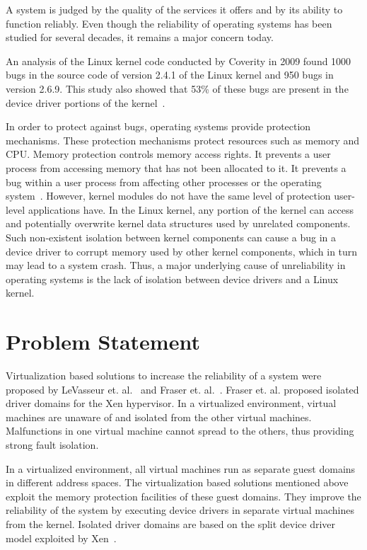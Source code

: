 A system is judged by the quality of the services it offers and by its
ability to function reliably. Even though the reliability of operating
systems has been studied for several decades, it remains a major concern
today.

An analysis of the Linux kernel code conducted by Coverity in 2009 found
1000 bugs in the source code of version 2.4.1 of the Linux kernel and
950 bugs in version 2.6.9. This study also showed that 53\% of these bugs are
present in the device driver portions of the kernel~\cite{coveritykernel}.

In order to protect against bugs, operating systems provide protection
mechanisms. These protection mechanisms protect resources such as memory
and CPU.  Memory protection controls memory access rights. It prevents a
user process from accessing memory that has not been allocated to it. It
prevents a bug within a user process from affecting other processes
or the operating system~\cite{denning1970virtual, Galvin}. However,
kernel modules do not have the same level of protection user-level
applications have. In the Linux kernel, any portion of the kernel can
access and potentially overwrite kernel data structures used by unrelated
components. Such non-existent isolation between kernel components can
cause a bug in a device driver to corrupt memory used by other kernel
components, which in turn may lead to a system crash. Thus, a major underlying
cause of unreliability in operating systems is the lack of isolation
between device drivers and a Linux kernel.

\section {Problem Statement}
\label{sec:problem}
Virtualization based solutions to increase the reliability of a system were
proposed by LeVasseur et. al.~\cite{LeVasseur04UnmodifiedDriverReuse}
and Fraser et. al.~\cite{Fraser04safehardware,driverdomain}. Fraser et. al. proposed
isolated driver domains for the Xen hypervisor. In a virtualized
environment, virtual machines are unaware of and isolated from the other
virtual machines. Malfunctions in one virtual machine cannot spread to
the others, thus providing strong fault isolation.

In a virtualized environment, all virtual machines run as separate
guest domains in different address spaces. The virtualization based
solutions mentioned above exploit the memory protection facilities of these
guest domains. They improve the reliability of the system by executing
device drivers in separate virtual machines from the kernel. 
Isolated driver domains are based on the split
device driver model exploited by Xen~\cite{Chisnall:2007:DGX:1407351}.

